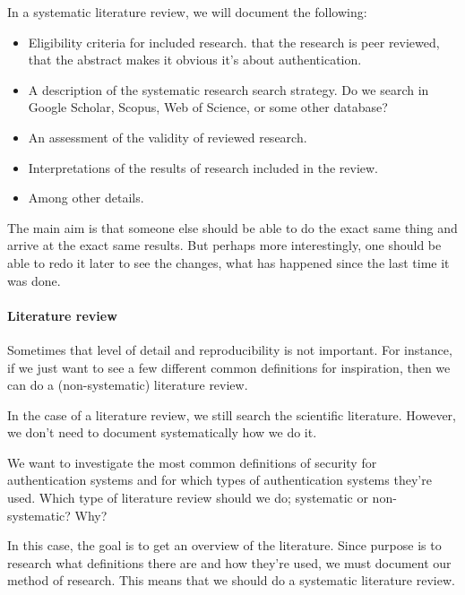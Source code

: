 In a systematic literature review, we will document the 
following\autocite{ElsevierSLR}:
\begin{itemize}
  \item Eligibility criteria for included research.
    \Eg that the research is peer reviewed, that the abstract makes it 
    obvious it's about authentication.
  \item A description of the systematic research search strategy.
    Do we search in Google Scholar, Scopus, Web of Science, or some other 
    database?
  \item An assessment of the validity of reviewed research.
  \item Interpretations of the results of research included in the review.
  \item Among other details.
\end{itemize}
The main aim is that someone else should be able to do the exact same thing and 
arrive at the exact same results.
But perhaps more interestingly, one should be able to redo it later to see the 
changes, what has happened since the last time it was done.

\paragraph{Literature review}

Sometimes that level of detail and reproducibility is not important.
For instance, if we just want to see a few different common definitions for 
inspiration, then we can do a (non-systematic) literature review.

In the case of a literature review, we still search the scientific literature.
However, we don't need to document systematically how we do it.

\begin{frame}
  \begin{exercise}
    We want to investigate the most common definitions of security for 
    authentication systems and for which types of authentication systems 
    they're used.
    Which type of literature review should we do; systematic or non-systematic?
    Why?
  \end{exercise}
\end{frame}

In this case, the goal is to get an overview of the literature.
Since purpose is to research what definitions there are and how they're used, 
we must document our method of research.
This means that we should do a systematic literature review.

